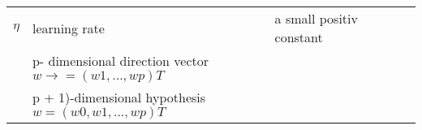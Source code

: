 \begin{table}[]
{\begin{tabular}{l p{} l p{} l p{}}
$\eta$                                                                      & {learning rate}                                                                & a small positiv constant                                                                                              \\
                                                                       & p- dimensional direction vector $w \rightarrow = (w1, . . . , wp) T$ &                                                                                                                       \\
                                                                       & p + 1)-dimensional hypothesis $w = (w0, w1, . . . , wp) T$                                                                                                                                             & 
\end{tabular}
}
\end{table}